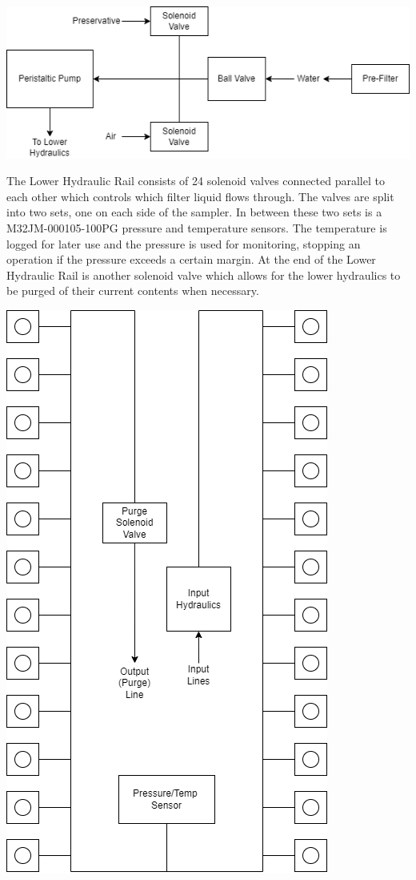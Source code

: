 \documentclass[11pt, letterpaper]{article}
\begin{document}
\begin{center}
	\includegraphics[scale=0.75]{./Assets/PolyWAG_HX_HD_InHydr.png}
\end{center}

The Lower Hydraulic Rail consists of 24 solenoid valves connected parallel to each other which controls which filter liquid flows through. The valves are split into two sets, one on each side of the sampler. In between these two sets is a M32JM-000105-100PG pressure and temperature sensors. The temperature is logged for later use and the pressure is used for monitoring, stopping an operation if the pressure exceeds a certain margin. At the end of the Lower Hydraulic Rail is another solenoid valve which allows for the lower hydraulics to be purged of their current contents when necessary.

\begin{center}
	\includegraphics[scale=0.65, angle=-90]{./Assets/PolyWAG_HX_HD_LHR.png}
\end{center}
\end{document}
